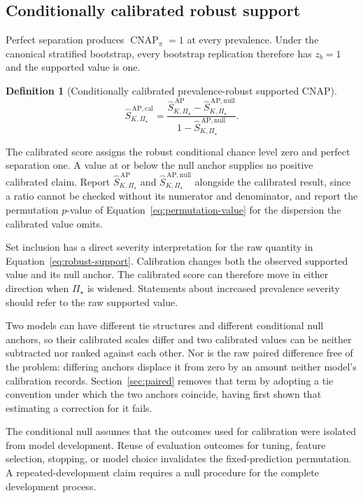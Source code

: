 \documentclass[11pt]{article}
\newcommand{\CNAP}{\operatorname{CNAP}}
\newcommand{\PSet}{\Pi_\star}
\newcommand{\SRobHat}{\widehat S_{K,\PSet}^{\,\mathrm{AP}}}
\newcommand{\SRobNullHat}{\widehat S_{K,\PSet}^{\,\mathrm{AP,null}}}
\newcommand{\SRobCalHat}{\widehat S_{K,\PSet}^{\,\mathrm{AP,cal}}}
\newtheorem{definition}{Definition}
\theoremstyle{remark}
\begin{document}
\subsection{Conditionally calibrated robust support}
\label{sec:calibration-def}

Perfect separation produces $\CNAP_\pi=1$ at every prevalence. Under the canonical stratified bootstrap, every bootstrap replication therefore has $z_b=1$ and the supported value is one.

\begin{definition}[Conditionally calibrated prevalence-robust supported CNAP]
\begin{equation}
\SRobCalHat
=
\frac{
\SRobHat-\SRobNullHat
}{
1-\SRobNullHat
}.
\label{eq:robust-calibration}
\end{equation}
\end{definition}

The calibrated score assigns the robust conditional chance level zero and perfect separation one. A value at or below the null anchor supplies no positive calibrated claim. Report $\SRobHat$ and $\SRobNullHat$ alongside the calibrated result, since a ratio cannot be checked without its numerator and denominator, and report the permutation $p$-value of Equation~\eqref{eq:permutation-value} for the dispersion the calibrated value omits.

Set inclusion has a direct severity interpretation for the raw quantity in Equation~\eqref{eq:robust-support}. Calibration changes both the observed supported value and its null anchor. The calibrated score can therefore move in either direction when $\PSet$ is widened. Statements about increased prevalence severity should refer to the raw supported value.

Two models can have different tie structures and different conditional null anchors, so their calibrated scales differ and two calibrated values can be neither subtracted nor ranked against each other. Nor is the raw paired difference free of the problem: differing anchors displace it from zero by an amount neither model's calibration records. Section~\ref{sec:paired} removes that term by adopting a tie convention under which the two anchors coincide, having first shown that estimating a correction for it fails.

The conditional null assumes that the outcomes used for calibration were isolated from model development. Reuse of evaluation outcomes for tuning, feature selection, stopping, or model choice invalidates the fixed-prediction permutation. A repeated-development claim requires a null procedure for the complete development process.
\end{document}
